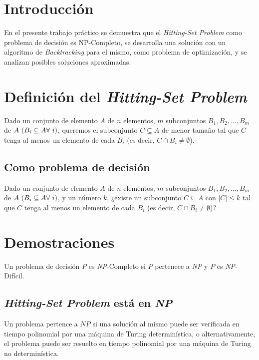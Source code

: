 \section{Introducción}

En el presente trabajo práctico se demuestra que el \textit{Hitting-Set
Problem} como problema de decisión es NP-Completo, se desarrolla una solución
con un algoritmo de \textit{Backtracking} para el mismo, como problema de
optimización, y se analizan posibles soluciones aproximadas.

\section{Definición del \textit{Hitting-Set Problem}}

Dado un conjunto de elemento $A$ de $n$ elementos, $m$ subconjuntos $B_1, B_2,
\ldots, B_m$ de $A \ (B_i \subseteq A \\ \forall \ i)$, queremos el subconjunto
$C \subseteq A$ de menor tamaño tal que $C$ tenga al menos un elemento de cada
$B_i$ (es decir, $C \cap B_i \ne \emptyset$).

\subsection{Como problema de decisión}

Dado un conjunto de elemento $A$ de $n$ elementos, $m$ subconjuntos $B_1, B_2,
\ldots, B_m$ de $A \ (B_i \subseteq A \\ \forall \ i)$, y un número $k$, ¿existe un
subconjunto $C \subseteq A$ con $|C| \le k$ tal que $C$ tenga al menos un
elemento de cada $B_i$ (es decir, $C \cap B_i \ne \emptyset$)?

\section{Demostraciones}

Un problema de decisión $P$ es \textit{NP}-Completo si $P$ pertenece a
\textit{NP} y $P$ es \textit{NP}-Difícil.

\subsection{\textit{Hitting-Set Problem} está en \textit{NP}}

Un problema pertence a $NP$ si una solución al mismo puede ser verificada en
tiempo polinomial por una máquina de Turing determinística, o alternativamente,
el problema puede ser resuelto en tiempo polinomial por una máquina de Turing
no determinística.

